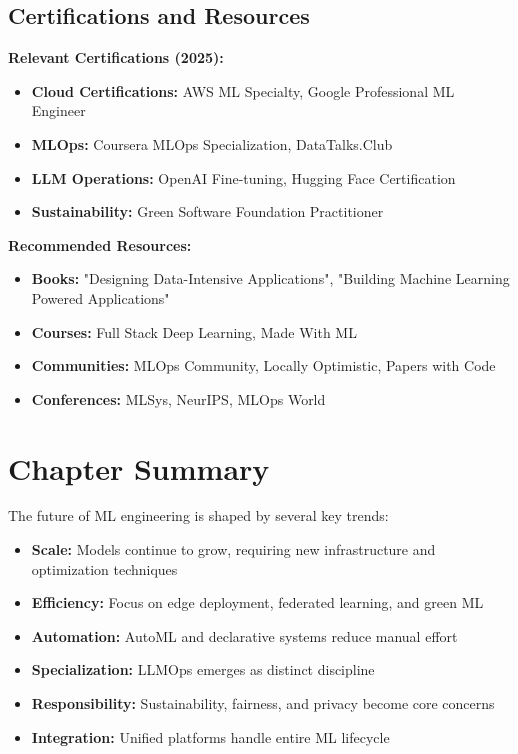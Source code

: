 \subsection{Certifications and Resources}

\textbf{Relevant Certifications (2025):}

\begin{itemize}
    \item \textbf{Cloud Certifications:} AWS ML Specialty, Google Professional ML Engineer
    \item \textbf{MLOps:} Coursera MLOps Specialization, DataTalks.Club
    \item \textbf{LLM Operations:} OpenAI Fine-tuning, Hugging Face Certification
    \item \textbf{Sustainability:} Green Software Foundation Practitioner
\end{itemize}

\textbf{Recommended Resources:}

\begin{itemize}
    \item \textbf{Books:} "Designing Data-Intensive Applications", "Building Machine Learning Powered Applications"
    \item \textbf{Courses:} Full Stack Deep Learning, Made With ML
    \item \textbf{Communities:} MLOps Community, Locally Optimistic, Papers with Code
    \item \textbf{Conferences:} MLSys, NeurIPS, MLOps World
\end{itemize}

\section{Chapter Summary}

The future of ML engineering is shaped by several key trends:

\begin{itemize}
    \item \textbf{Scale:} Models continue to grow, requiring new infrastructure and optimization techniques
    \item \textbf{Efficiency:} Focus on edge deployment, federated learning, and green ML
    \item \textbf{Automation:} AutoML and declarative systems reduce manual effort
    \item \textbf{Specialization:} LLMOps emerges as distinct discipline
    \item \textbf{Responsibility:} Sustainability, fairness, and privacy become core concerns
    \item \textbf{Integration:} Unified platforms handle entire ML lifecycle
\end{itemize}

